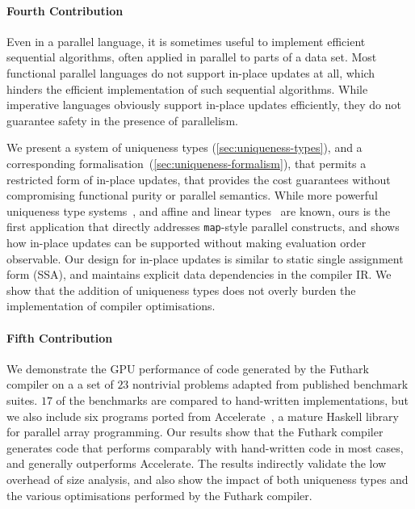 \paragraph{Fourth Contribution}

Even in a parallel language, it is sometimes useful to implement
efficient sequential algorithms, often applied in parallel to parts of
a data set.  Most functional parallel languages do not support
in-place updates at all, which hinders the efficient implementation of
such sequential algorithms.  While imperative languages obviously
support in-place updates efficiently, they do not guarantee safety in
the presence of parallelism.

We present a system of uniqueness types (\cref{sec:uniqueness-types}),
and a corresponding formalisation~(\cref{sec:uniqueness-formalism}),
that permits a restricted form of in-place updates, that provides the
cost guarantees without compromising functional purity or parallel
semantics.  While more powerful uniqueness type
systems~\cite{clean-uniqueness-types}, and affine and linear
types~\cite{Tov:2011:PAT:1926385.1926436,Fahndrich:2002:AFP:543552.512532}
are known, ours is the first application that directly addresses
\texttt{map}-style parallel constructs, and shows how in-place updates
can be supported without making evaluation order observable.  Our
design for in-place updates is similar to static single assignment
form (SSA), and maintains explicit data dependencies in the compiler
IR.  We show that the addition of uniqueness types does not overly
burden the implementation of compiler optimisations.

\paragraph{Fifth Contribution}

We demonstrate the GPU performance of code generated by the Futhark
compiler on a a set of $23$ nontrivial problems adapted from published
benchmark suites.  $17$ of the benchmarks are compared to hand-written
implementations, but we also include six programs ported from
Accelerate~\cite{mcdonell2013optimising}, a mature Haskell library for
parallel array programming. Our results show that the Futhark compiler
generates code that performs comparably with hand-written code in most
cases, and generally outperforms Accelerate.  The results indirectly
validate the low overhead of size analysis, and also show the impact
of both uniqueness types and the various optimisations performed by
the Futhark compiler.

